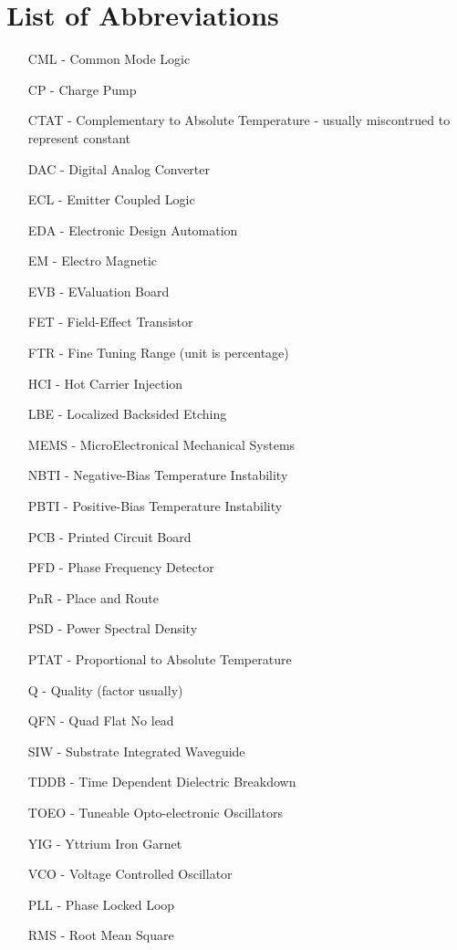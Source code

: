 \documentclass{article}
\begin{document}
\section{List of Abbreviations} %

\begin{itemize}
	\item [CML	-] Common Mode Logic
	\item [CP	-] Charge Pump
	\item [CTAT	-] Complementary to Absolute Temperature - usually miscontrued to represent constant 
	\item [DAC	-] Digital Analog Converter
	\item [ECL  -] Emitter Coupled Logic
	\item [EDA	-] Electronic Design Automation
	\item [EM	-] Electro Magnetic
	\item [EVB	-] EValuation Board
	\item [FET	-] Field-Effect Transistor
	\item [FTR	-] Fine Tuning Range (unit is percentage)
	\item [HCI  -] Hot Carrier Injection
	\item [LBE 	-] Localized Backsided Etching
	\item [MEMS	-] MicroElectronical Mechanical Systems
	\item [NBTI -] Negative-Bias Temperature Instability
	\item [PBTI	-] Positive-Bias Temperature Instability
	\item [PCB  -] Printed Circuit Board
	\item [PFD	-] Phase Frequency Detector
	\item [PnR  -] Place and Route
	\item [PSD	-] Power Spectral Density
	\item [PTAT	-] Proportional to Absolute Temperature
	\item [Q	-] Quality (factor usually)
	\item [QFN	-] Quad Flat No lead
	\item [SIW	-] Substrate Integrated Waveguide
	\item [TDDB	-] Time Dependent Dielectric Breakdown
	\item [TOEO -] Tuneable Opto-electronic Oscillators
	\item [YIG  -] Yttrium Iron Garnet %
	\item [VCO  -] Voltage Controlled Oscillator
	\item [PLL  -] Phase Locked Loop 
	\item [RMS  -] Root Mean Square 
\end{itemize}
\end{document}
